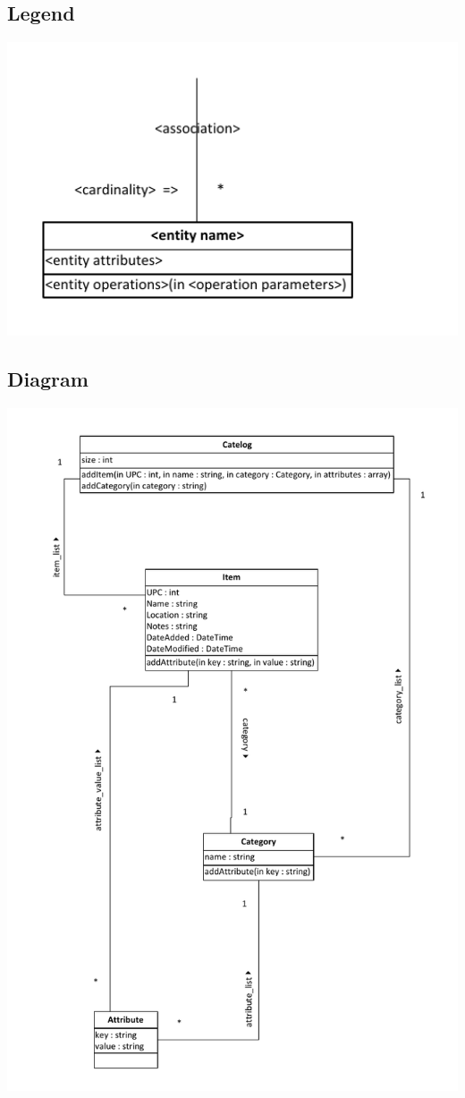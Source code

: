 \documentclass{article}
\begin{document}
\subsection{Legend}
\includegraphics[keepaspectratio, width=6in]{class_diagram_legend.pdf}
\subsection{Diagram}
\includegraphics[keepaspectratio, width=5.25in]{class_diagram.pdf} \\
\end{document}
